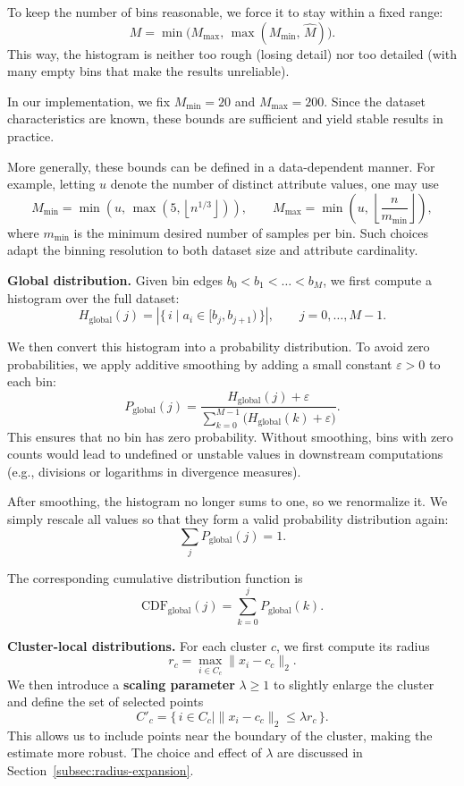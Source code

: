To keep the number of bins reasonable, we force it to stay within a fixed range:
\[
M = \min\!\bigl(M_{\max},\, \max(M_{\min},\, \widehat{M})\bigr).
\]
This way, the histogram is neither too rough (losing detail) nor too detailed
(with many empty bins that make the results unreliable).

In our implementation, we fix $M_{\min} = 20$ and $M_{\max} = 200$. Since the
dataset characteristics are known, these bounds are
sufficient and yield stable results in practice.

More generally, these bounds can be defined in a data-dependent manner. For
example, letting $u$ denote the number of distinct attribute values, one may use
\[
M_{\min} = \min\!\left(u,\, \max\!\left(5, \left\lfloor n^{1/3} \right\rfloor \right)\right),
\qquad
M_{\max} = \min\!\left(u,\, \left\lfloor \frac{n}{m_{\min}} \right\rfloor \right),
\]
where $m_{\min}$ is the minimum desired number of samples per bin. Such choices
adapt the binning resolution to both dataset size and attribute cardinality.

\textbf{Global distribution.}
Given bin edges \(b_0 < b_1 < \dots < b_M\), we first compute a histogram over
the full dataset:
\[
H_{\mathrm{global}}(j)
=
\left|
\{\, i \mid a_i \in [b_j, b_{j+1}) \,\}
\right|,
\qquad j=0,\dots,M-1.
\]

We then convert this histogram into a probability distribution. To avoid zero
probabilities, we apply additive smoothing by adding a small constant
\(\varepsilon > 0\) to each bin:
\[
P_{\mathrm{global}}(j)
=
\frac{H_{\mathrm{global}}(j) + \varepsilon}
{\sum_{k=0}^{M-1} \bigl(H_{\mathrm{global}}(k) + \varepsilon\bigr)}.
\]
This ensures that no bin has zero probability.
Without smoothing, bins with zero counts would lead to undefined or unstable
values in downstream computations (e.g., divisions or logarithms in divergence
measures).

After smoothing, the histogram no longer sums to one, so we renormalize it.
We simply rescale all values so that they form a valid probability
distribution again:
\[
\sum_j P_{\mathrm{global}}(j) = 1.
\]

The corresponding cumulative distribution function is
\[
\mathrm{CDF}_{\mathrm{global}}(j)
=
\sum_{k=0}^{j} P_{\mathrm{global}}(k).
\]

\textbf{Cluster-local distributions.}
For each cluster \(c\), we first compute its radius
\[
r_c = \max_{i \in C_c} \|x_i - c_c\|_2.
\]
We then introduce a \textbf{scaling parameter} \(\lambda \ge 1\) to slightly enlarge the
cluster and define the set of selected points
\[
C'_c = \{\, i \in C_c \mid \|x_i - c_c\|_2 \le \lambda r_c \,\}.
\]
This allows us to include points near the boundary of the cluster, making the
estimate more robust. The choice and effect of \(\lambda\) are discussed in
Section~\ref{subsec:radius-expansion}.

